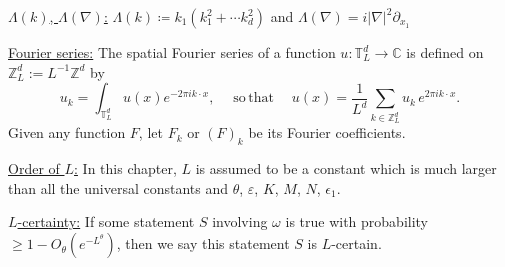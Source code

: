 \underline{$\Lambda(k)$, $\Lambda(\nabla)$:} $\Lambda(k)\coloneqq k_{1}(k_1^2+\cdots k_d^2)$ and $\Lambda(\nabla) = i|\nabla|^2\partial_{x_1}$

\underline{Fourier series:} The spatial Fourier series of a function $u: \mathbb{T}_L^d \to \mathbb C$ is defined on $\mathbb{Z}^d_L:=L^{-1}\mathbb{Z}^{d}$ by
\begin{equation}\label{fourierset}
u_k=\int_{\mathbb{T}^d_L} u(x) e^{-2\pi i k\cdot x},\quad \mathrm{\; so \,that \;}\quad u(x)=\frac{1}{L^d}\sum_{k \in \mathbb{Z}^d_L} u_k \,e^{2\pi i k\cdot x}. 
\end{equation}
Given any function $F$, let $F_k$ or $(F)_k$ be its Fourier coefficients.

\underline{Order of $L$:} In this chapter, $L$ is assumed to be a constant which is much larger than all the universal constants and $\theta$, $\varepsilon$, $K$, $M$, $N$, $\epsilon_1$. 

\underline{$L$-certainty:} If some statement $S$ involving $\omega$ is true with probability $\geq 1-O_{\theta}(e^{-L^\theta})$, then we say this statement $S$ is $L$-certain.

